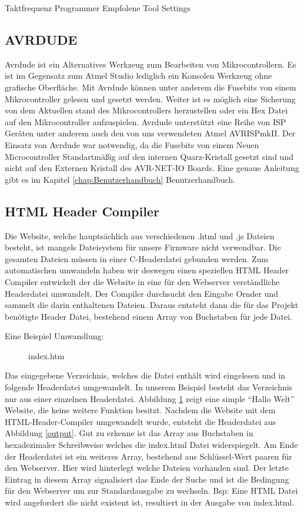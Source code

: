 Taktfrequenz
Programmer
Empfolene Tool Settings

\subsection{AVRDUDE}

Avrdude ist ein Alternatives Werkzeug zum Bearbeiten von Mikrocontrollern. Es
ist im Gegensatz zum Atmel Studio lediglich ein Konsolen Werkzeug ohne
grafische Oberfläche. Mit Avrdude können unter anderem die Fusebits von einem
Mikrocontroller gelesen und gesetzt werden. Weiter ist es möglich eine Sicherung
von dem Aktuellen stand des Mikrocontrollers herzustellen oder ein Hex Datei auf
den Mikrocontroller aufzuspielen. Avrdude unterstützt eine Reihe von ISP Geräten
unter anderem auch den von uns verwendeten Atmel AVRISPmkII. Der Einsatz von
Avrdude war notwendig, da die Fusebits von einem Neuen Microcontroller
Standartmäßig auf den internen Quarz-Kristall gesetzt sind und nicht auf den
Externen Kristall des AVR-NET-IO Boards.
Eine genaue Anleitung gibt es im Kapitel \ref{chap:Benutzerhandbuch}
Benutzerhandbuch.

\subsection{HTML Header Compiler}

Die Website, welche hauptsächlich aus verschiedenen .html und .js Dateien
besteht, ist mangels Dateisystem für unsere Firmware nicht verwendbar. Die
gesamten Dateien müssen in einer C-Headerdatei gebunden werden. Zum
automatischen umwandeln haben wir deswegen einen speziellen HTML Header Compiler
entwickelt der die Website in eine für den Webserver verständliche Headerdatei umwandelt.
Der Compiler durchsucht den Eingabe Ornder und sammelt die darin enthaltenen
Dateien. Daraus entsteht dann die für das Projekt benötigte Header Datei,
bestehend einem Array von Buchstaben für jede Datei.

Eine Beispiel Umwandlung:


\begin{figure}[H]

\caption{index.htm}
\label{input}
\end{figure}

Das eingegebene Verzeichnis, welches die Datei enthält wird eingelesen und in
folgende Headerdatei umgewandelt. In unserem Beispiel besteht das Verzeichnis
nur aus einer einzelnen Headerdatei.
Abbildung \ref{input} zeigt eine simple "`Hallo Welt"' Website, die keine
weitere Funktion besitzt. Nachdem die Website mit dem HTML-Header-Compiler
umgewandelt wurde, entsteht die Headerdatei aus Abbildung \ref{output}. Gut zu
erkenne ist das Array aus Buchstaben in hexadezimaler Schreibweise welches die
index.html Datei widerspiegelt.
Am Ende der Headerdatei ist ein weiteres Array, bestehend aus Schlüssel-Wert
paaren für den Webserver. Hier wird hinterlegt welche Dateien vorhanden sind.
Der letzte Eintrag in diesem Array signalisiert das Ende der Suche und ist die
Bedingung für den Webserver um zur Standardausgabe zu wechseln. Bsp: Eine HTML
Datei wird angefordert die nicht existent ist, resultiert in der Ausgabe von
index.html.

